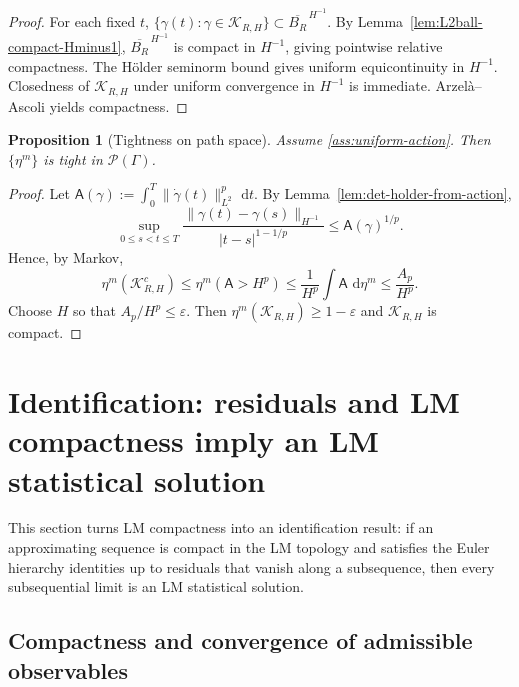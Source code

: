 \documentclass{article}
\numberwithin{equation}{section}
\theoremstyle{plain}
\newtheorem{proposition}[theorem]{Proposition}
\theoremstyle{definition}
\theoremstyle{remark}
\newcommand{\Pcal}{\mathcal{P}}
\newcommand{\dd}{\,\mathrm{d}}
\newcommand{\Kcal}{\mathcal{K}}
\begin{document}
\begin{proof}
For each fixed $t$, $\{\gamma(t):\gamma\in\Kcal_{R,H}\}\subset\overline{B_R}^{\,H^{-1}}$.
By Lemma~\ref{lem:L2ball-compact-Hminus1}, $\overline{B_R}^{\,H^{-1}}$ is compact in $H^{-1}$, giving pointwise relative compactness.
The H\"older seminorm bound gives uniform equicontinuity in $H^{-1}$.
Closedness of $\Kcal_{R,H}$ under uniform convergence in $H^{-1}$ is immediate.
Arzel\`a--Ascoli yields compactness.
\end{proof}

\begin{proposition}[Tightness on path space]\label{prop:tightness-path}
Assume \cref{ass:uniform-action}. Then $\{\eta^m\}$ is tight in $\Pcal(\Gamma)$.
\end{proposition}

\begin{proof}
Let $\mathsf A(\gamma):=\int_0^T\|\dot\gamma(t)\|_{L^2}^p\,\dd t$.
By Lemma~\ref{lem:det-holder-from-action},
\[
\sup_{0\le s<t\le T}\frac{\|\gamma(t)-\gamma(s)\|_{H^{-1}}}{|t-s|^{1-1/p}}
\le \mathsf A(\gamma)^{1/p}.
\]
Hence, by Markov,
\[
\eta^m(\Kcal_{R,H}^c)\le \eta^m(\mathsf A>H^p)\le \frac{1}{H^p}\int \mathsf A\,\dd\eta^m \le \frac{A_p}{H^p}.
\]
Choose $H$ so that $A_p/H^p\le\varepsilon$. Then $\eta^m(\Kcal_{R,H})\ge 1-\varepsilon$ and $\Kcal_{R,H}$ is compact.
\end{proof}




\section{Identification: residuals and LM compactness imply an LM statistical solution}
\label{sec:identify}

This section turns LM compactness into an identification result: if an approximating sequence is compact in the LM topology
and satisfies the Euler hierarchy identities up to residuals that vanish along a subsequence, then every subsequential
limit is an LM statistical solution.

\subsection{Compactness and convergence of admissible observables}
\end{document}
